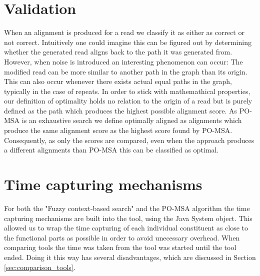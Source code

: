 \documentclass[thesis.tex]{subfiles}
\begin{document}
\section{Validation}
\label{sec:performance_validation}
When an alignment is produced for a read we classify it as either as correct or not correct. Intuitively one could imagine this can be figured out by determining whether the generated read aligns back to the path it was generated from. However, when noise is introduced an interesting phenomenon can occur: The modified read can be more similar to another path in the graph than its origin. This can also occur whenever there exists actual equal paths in the graph, typically in the case of repeats. In order to stick with mathemathical properties, our definition of optimality holds no relation to the origin of a read but is purely defined as the path which produces the highest possible alignment score. As PO-MSA is an exhaustive search we define optimally aligned as alignments which produce the same alignment score as the highest score found by PO-MSA. Consequently, as only the scores are compared, even when the approach produces a different alignments than PO-MSA this can be classified as optimal.\\
\par\noindent
\section{Time capturing mechanisms}
For both the "Fuzzy context-based search" and the PO-MSA algorithm the time capturing mechanisms are built into the tool, using the Java System object. This allowed us to wrap the time capturing of each individual constituent as close to the functional parts as possible in order to avoid unecessary overhead. When comparing tools the time was taken from the tool was started until the tool ended. Doing it this way has several disadvantages, which are discussed in Section \ref{sec:comparison_tools}.
\end{document}
